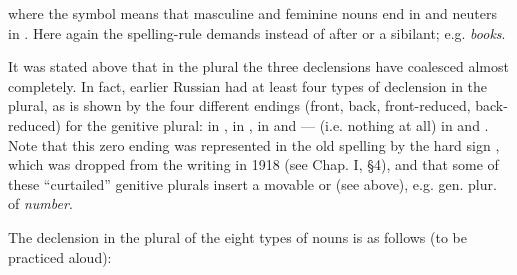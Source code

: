 where the symbol  means that masculine and feminine nouns end in  and neuters in . Here again the spelling-rule demands  instead of  after  or a sibilant; e.g.  \emph{books}.

It was stated above that in the plural the three declensions have coalesced almost completely. In fact, earlier Russian had at least four types of declension in the plural, as is shown by the four different endings (front, back, front-reduced, back-reduced) for the genitive plural:  in ,  in ,  in  and --- (i.e. nothing at all) in  and . Note that this zero ending was represented in the old spelling by the hard sign , which was dropped from the writing in 1918 (see Chap. I, §4), and that some of these ``curtailed'' genitive plurals insert a movable  or  (see above), e.g.  gen. plur. of  \emph{number}.

The declension in the plural of the eight types of nouns is as follows (to be practiced aloud):

